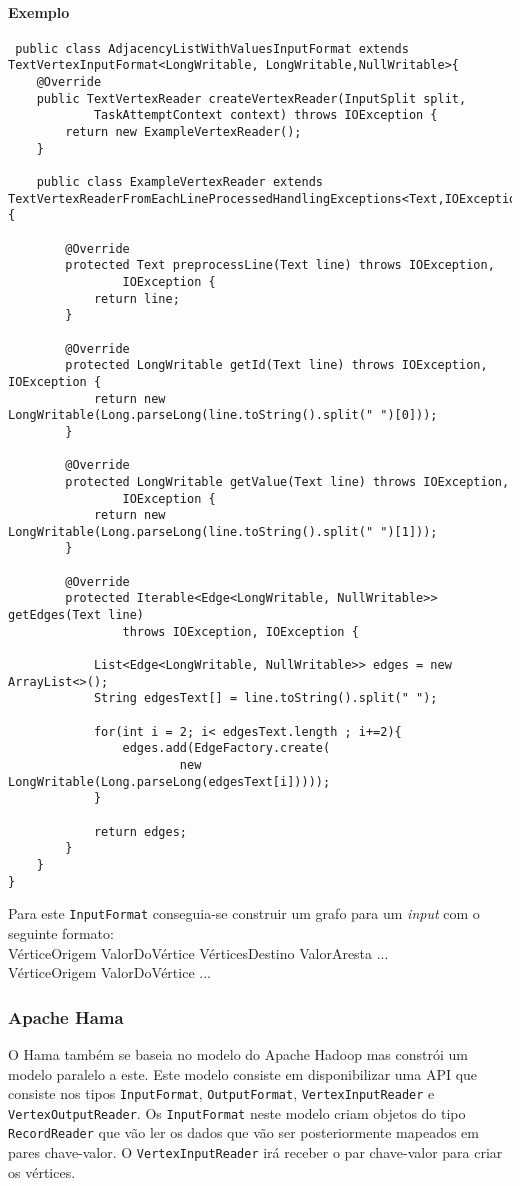 \paragraph{Exemplo}
\begin{verbatim}
 public class AdjacencyListWithValuesInputFormat extends 
TextVertexInputFormat<LongWritable, LongWritable,NullWritable>{
	@Override
	public TextVertexReader createVertexReader(InputSplit split,
			TaskAttemptContext context) throws IOException { 
		return new ExampleVertexReader();
	}
	
	public class ExampleVertexReader extends 
TextVertexReaderFromEachLineProcessedHandlingExceptions<Text,IOException>{

		@Override
		protected Text preprocessLine(Text line) throws IOException,
				IOException {
			return line;
		}

		@Override
		protected LongWritable getId(Text line) throws IOException, 
IOException {
			return new 
LongWritable(Long.parseLong(line.toString().split(" ")[0]));
		}

		@Override
		protected LongWritable getValue(Text line) throws IOException,
				IOException {
			return new 
LongWritable(Long.parseLong(line.toString().split(" ")[1]));
		}

		@Override
		protected Iterable<Edge<LongWritable, NullWritable>> 
getEdges(Text line)
				throws IOException, IOException {
			
			List<Edge<LongWritable, NullWritable>> edges = new 
ArrayList<>();
			String edgesText[] = line.toString().split(" ");
			
			for(int i = 2; i< edgesText.length ; i+=2){
				edges.add(EdgeFactory.create(
						new 
LongWritable(Long.parseLong(edgesText[i]))));
			}
			
			return edges;
		}
	}
}
\end{verbatim}

Para este \texttt{InputFormat} conseguia-se construir um grafo para um 
\textit{input} com o seguinte formato:\\
VérticeOrigem ValorDoVértice VérticesDestino ValorAresta ... \\
VérticeOrigem ValorDoVértice ...

\subsubsection*{Apache Hama}

O Hama também se baseia no modelo do Apache Hadoop mas constrói um modelo paralelo a este.
Este modelo consiste em disponibilizar uma API que consiste nos tipos \texttt{InputFormat}, \texttt{OutputFormat}, \texttt{VertexInputReader} e \texttt{VertexOutputReader}. Os \texttt{InputFormat} neste modelo criam objetos do tipo \texttt{RecordReader} 
que vão ler os dados que vão ser posteriormente mapeados em pares chave-valor. O \texttt{VertexInputReader} irá receber o par chave-valor para criar os
vértices.

